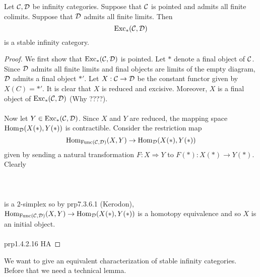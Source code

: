 \documentclass[a4paper]{article}
\begin{document}
\begin{prp}{}{} Let $\mathcal{C},\mathcal{D}$ be infinity categories. Suppose that $\mathcal{C}$ is pointed and admits all finite colimits. Suppose that $\mathcal{D}$ admits all finite limits. Then $$\text{Exc}_\ast(\mathcal{C},\mathcal{D})$$ is a stable infinity category. \tcbline
\begin{proof}
We first show that $\text{Exc}_\ast(\mathcal{C},\mathcal{D})$ is pointed. Let $\ast$ denote a final object of $\mathcal{C}$. Since $\mathcal{D}$ admits all finite limits and final objects are limits of the empty diagram, $\mathcal{D}$ admits a final object $\ast'$. Let $X:\mathcal{C}\to\mathcal{D}$ be the constant functor given by $X(C)=\ast'$. It is clear that $X$ is reduced and excisive. Moreover, $X$ is a final object of $\text{Exc}_\ast(\mathcal{C},\mathcal{D})$ (Why ????). \\~\\

Now let $Y\in\text{Exc}_\ast(\mathcal{C},\mathcal{D})$. Since $X$ and $Y$ are reduced, the mapping space $\operatorname{Hom}_{\mathcal{D}}(X(\ast),Y(\ast))$ is contractible. Consider the restriction map $$\operatorname{Hom}_{\text{Func}(\mathcal{C},\mathcal{D})}(X,Y)\to\operatorname{Hom}_{\mathcal{D}}(X(\ast),Y(\ast))$$ given by sending a natural transformation $F:X\Rightarrow Y$ to $F(\ast):X(\ast)\to Y(\ast)$. Clearly \\~\\
\\~\\
is a $2$-simplex so by prp7.3.6.1 (Kerodon), $\operatorname{Hom}_{\text{Func}(\mathcal{C},\mathcal{D})}(X,Y)\to\operatorname{Hom}_{\mathcal{D}}(X(\ast),Y(\ast))$ is a homotopy equivalence and so $X$ is an initial object. \\~\\

prp1.4.2.16 HA
\end{proof}
\end{prp}

We want to give an equivalent characterization of stable infinity categories. Before that we need a technical lemma. 
\end{document}
